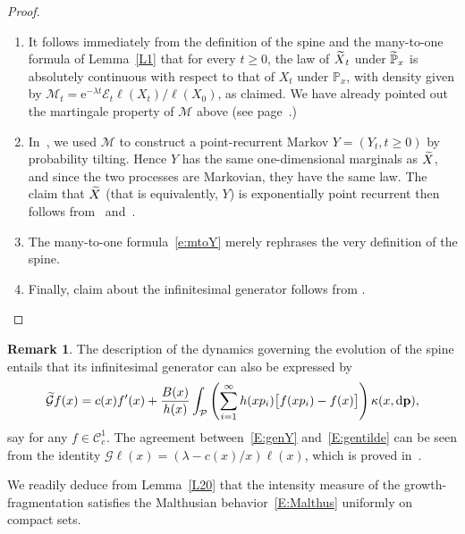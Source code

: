 \documentclass[11pt]{article}
\theoremstyle{definition}
\newtheorem{rema}[theo]{Remark}
\newenvironment{proofc}{\begin{proof}}{\end{proof}}
\providecommand{\mathof}[1]{\mathrm{#1}}
\numberwithin{equation}{section}
\numberwithin{figure}{section}
\numberwithin{table}{section}
\newcommand\Pp{\mathcal{P}}
\newcommand\PP{\mathbb{P}}
\newcommand\Ee{\mathcal{E}}
\newcommand\pp{\mathbf{p}}
\newcommand\e{\mathrm{e}}
\newcommand\dd{\mathof{d}}
\newcommand*{\MK}{\mkern 2mu}
\let\oldtilde\tilde
\renewcommand*{\tilde}[1]{\mathchoice{\widetilde{#1}}{\widetilde{#1}}{\oldtilde{#1}}{\oldtilde{#1}}}
\begin{document}
\begin{proofc}
\begin{enumerate}
\item \label{listproof4.4.1}It follows immediately from the definition of the spine and the many-to-one formula of Lemma~\ref{L1} that for every $t\geq 0$, the law of $\tilde X_t$ under $\tilde \PP_x$ is absolutely continuous with respect to that of $X_t$ under $\PP_x$, with density given by $\mathcal{M}_t = \e^{-\lambda t} \Ee_t \ell(X_t)/\ell(X_0)$, as claimed. We have already pointed out the martingale property of $\mathcal{M}$ above (see page~\pageref{s:mart}.)

\item \label{listproof4.4.2}In~\cite[Section~5]{BW}, we used $\mathcal{M}$ to construct a point-recurrent Markov $Y=(Y_t, t\geq 0)$ by probability tilting. Hence $Y$ has the same one-dimensional marginals as $\tilde X$, and since the two processes are Markovian, they have the same law. The claim that $\tilde X$ (that is equivalently, $Y$) is exponentially point recurrent then follows from~\cite[Proof of Theorem~2]{BeFK} and~\cite[Lemma~5.2$\MK$(iii)]{BW}.

\item \label{listproof4.4.3}The many-to-one formula~\eqref{e:mtoY} merely rephrases the very definition of the spine.

\item \label{listproof4.4.4}Finally, claim about the infinitesimal generator follows from \cite[Lem\-ma~5.1]{BW}.
\end{enumerate}
\end{proofc}

\begin{rema}
The description of the dynamics governing the evolution of the spine entails that its infinitesimal generator can also be expressed by
\begin{equation}\label{E:gentilde}
\tilde {\mathcal G}f(x) = c(x) f'(x) + \frac{B(x)}{h(x)} \int_{\Pp} \left(\sum_{i=1}^{\infty}h(xp_i)\bigl[f(xp_i)-f(x)\bigr]\right) \kappa(x, \dd \pp),
\end{equation}
say for any $f\in{\mathcal C}^1_c$. The agreement between~\eqref{E:genY} and~\eqref{E:gentilde} can be seen from the identity $\mathcal{G}\ell(x) = (\lambda - c(x)/x)\ell(x)$, which is proved in~\cite[Corollary~4.5$\MK$(i)]{BW}.
\end{rema}

We readily deduce from Lemma~\ref{L20} that the intensity measure of the growth-fragmentation satisfies the Malthusian behavior~\eqref{E:Malthus} uniformly on compact sets.
\end{document}
